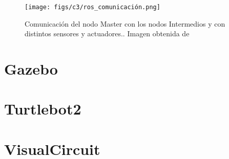 \begin{figure} [H]
    \begin{center}
        \texttt{[image: figs/c3/ros\_comunicación.png]}
    \end{center}
    \caption[Comunicación del nodo Master con los nodos Intermedios y con distintos sensores y actuadores.]{Comunicación del nodo Master con los nodos Intermedios y con distintos sensores y actuadores.. Imagen obtenida de \cite{comunicacion_ros2}}
    \label{fig:ros_master_comunicacion}
\end{figure}




\section{Gazebo}
\label{sec:gazebo}
\section{Turtlebot2}
\label{sec:turtlebot2}
\section{VisualCircuit}
\label{sec:visualcircuit}